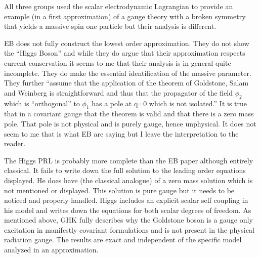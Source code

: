 \documentclass[letterpaper,twoside,preprintnumbers,slac_one]{revtex4}
\begin{document}
All three groups used the scalar electrodynamic Lagrangian to provide
an example (in a first approximation) of a gauge theory with a
broken symmetry that yields a massive spin one particle but their
analysis is different.

EB does not fully construct the lowest order approximation. They do
not show the ``Higgs Boson'' and while they do argue that their
approximation respects current conservation it seems to me that their
analysis is in general quite incomplete. They do make the essential
identification of the massive parameter. They further ``assume that
the application of the theorem of Goldstone, Salam and Weinberg is
straightforward and thus that the propagator of the field $\phi_2$ which
is ``orthogonal'' to $\phi_1$ has a pole at q=0 which is not isolated.''
It is true that in a covariant gauge that the theorem is valid and
that there is a zero mass pole. That pole is not physical and is
purely gauge, hence unphysical. It does not seem to me that
is what EB are saying but I leave the interpretation to the reader.

The Higgs PRL is probably more complete than the EB paper
although entirely classical. It  fails to write down the full
solution to the leading order equations displayed. He does have (the classical analogue) of a zero mass
solution which is not mentioned or displayed. This solution is pure gauge but it needs to be noticed and
properly handled. Higgs includes an explicit scalar
self coupling in his model and writes down the equations for both scalar
degrees of freedom. As mentioned above, GHK fully describes why the Goldstone boson is a gauge only
excitation in manifestly covariant formulations and is not present in
the physical radiation gauge. The results are exact and independent of the specific model
analyzed in an approximation.
\end{document}
